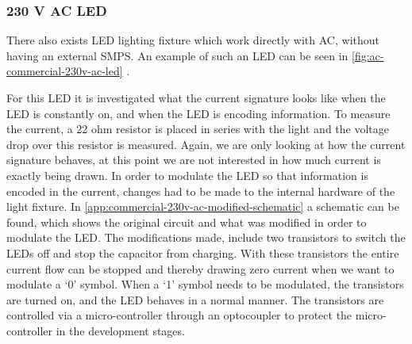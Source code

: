 
\subsubsection{230 V AC LED}


There also exists LED lighting fixture which work directly with AC, without having an external SMPS.
An example of such an LED can be seen in \autoref{fig:ac-commercial-230v-ac-led} \cite{commercial-230v-ac-led-aliexpress}.



For this LED it is investigated what the current signature looks like when the LED is constantly on, and when the LED is encoding information.
To measure the current, a 22 ohm resistor is placed in series with the light and the voltage drop over this resistor is measured.
Again, we are only looking at how the current signature behaves, at this point we are not interested in how much current is exactly being drawn.
In order to modulate the LED so that information is encoded in the current, changes had to be made to the internal hardware of the light fixture.
In \autoref{app:commercial-230v-ac-modified-schematic} a schematic can be found, which shows the original circuit and what was modified in order to modulate the LED.
The modifications made, include two transistors to switch the LEDs off and stop the capacitor from charging. 
With these transistors the entire current flow can be stopped and thereby drawing zero current when we want to modulate a `0' symbol.
When a `1' symbol needs to be modulated, the transistors are turned on, and the LED behaves in a normal manner.
The transistors are controlled via a micro-controller through an optocoupler to protect the micro-controller in the development stages.



